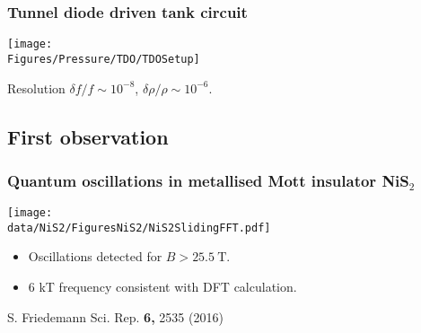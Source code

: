 \begin{frame}[label=DACTDO]
\frametitle{Tunnel diode driven tank circuit}

\centerline{\texttt{[image: \\Figures/Pressure/TDO/TDOSetup]}}

\centerline{Resolution $\delta f/f \sim 10^{-8}$,  $\delta \rho/\rho \sim 10^{-6}$.}
\end{frame}
 



\subsection{First observation}

\begin{frame}[label=QONiS2]
\frametitle{Quantum oscillations in metallised Mott insulator NiS$_2$}
\centerline{\texttt{[image: \\data/NiS2/FiguresNiS2/NiS2SlidingFFT.pdf]}}

\begin{itemize}
\item Oscillations detected for $B>25.5 ~\text{T}$. 
\item 6 kT frequency consistent with DFT calculation. %
\end{itemize}
\vspace*{\fill}
\vspace{-0.25em}
\centerline{\makebox[\linewidth]{\rule{0.85\textwidth}{0.4pt}}}
\centerline{\scriptsize S. Friedemann Sci. Rep. {\bf 6,} 2535 (2016)}
\end{frame}

